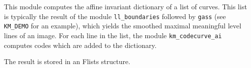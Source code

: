This module computes the affine invariant 
dictionary of a list of curves. 
This list is typically the result of the module \verb+ll_boundaries+ 
followed by \verb+gass+ (see \verb+KM_DEMO+ for an example), 
which yields the smoothed maximal meaningful 
level lines of an image. For each line in the list, the module 
\verb+km_codecurve_ai+ computes codes which are added to the dictionary.

\medskip

The result is stored in an Flists structure.

